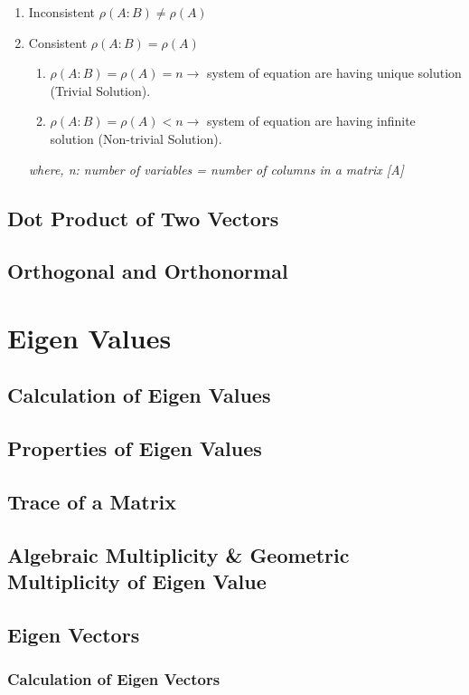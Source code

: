 \begin{enumerate}
    \item Inconsistent $\rho (A:B) \neq \rho(A)$

    \item Consistent $\rho (A:B) = \rho(A)$
    \begin{enumerate}
        \item $\rho (A:B) = \rho(A) = n \longrightarrow$ system of equation are having unique solution (Trivial Solution).

        \item $\rho (A:B) = \rho(A) < n \longrightarrow$ system of equation are having infinite solution (Non-trivial Solution).
    \end{enumerate}
    \textit{where, n: number of variables = number of columns in a matrix [A]}
\end{enumerate}

\subsection{Dot Product of Two Vectors}
\subsection{Orthogonal and Orthonormal}

\section{Eigen Values}
\subsection{Calculation of Eigen Values}
\subsection{Properties of Eigen Values}
\subsection{Trace of a Matrix}
\subsection{Algebraic Multiplicity & Geometric Multiplicity of Eigen Value}
\subsection{Eigen Vectors}
\subsubsection{Calculation of Eigen Vectors}
